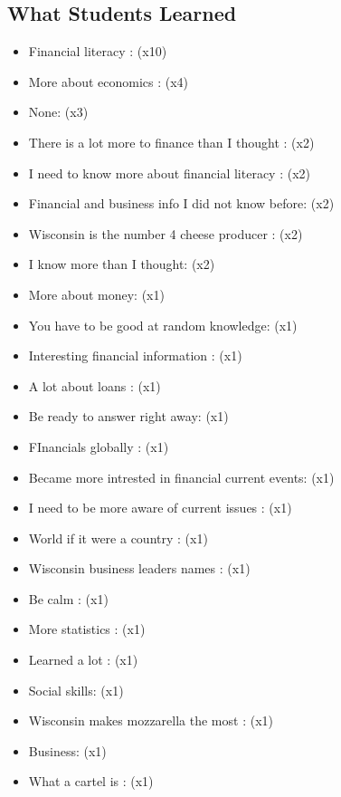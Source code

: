 \documentclass{article}%
\begin{document}
\begin{multicols}{2}%
\section{What Students Learned}%
\label{sec:WhatStudentsLearned}%
\begin{itemize}%
\item%
Financial literacy : (x10)%
\item%
More about economics : (x4)%
\item%
None: (x3)%
\item%
There is a lot more to finance than I thought : (x2)%
\item%
I need to know more about financial literacy : (x2)%
\item%
Financial and business info I did not know before: (x2)%
\item%
Wisconsin is the number 4 cheese producer : (x2)%
\item%
I know more than I thought: (x2)%
\item%
More about money: (x1)%
\item%
You have to be good at random knowledge: (x1)%
\item%
Interesting financial information : (x1)%
\item%
A lot about loans : (x1)%
\item%
Be ready to answer right away: (x1)%
\item%
FInancials globally : (x1)%
\item%
Became more intrested in financial current events: (x1)%
\item%
I need to be more aware of current issues : (x1)%
\item%
World if it were a country : (x1)%
\item%
Wisconsin business leaders names : (x1)%
\item%
Be calm : (x1)%
\item%
More statistics : (x1)%
\item%
Learned a lot : (x1)%
\item%
Social skills: (x1)%
\item%
Wisconsin makes mozzarella the most : (x1)%
\item%
Business: (x1)%
\item%
What a cartel is : (x1)%
\end{itemize}

%
\end{multicols}%
\noindent\makebox[\linewidth]{\rule{\paperwidth}{0.4pt}}%
\end{document}
